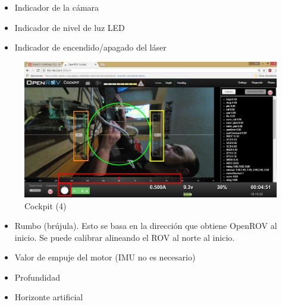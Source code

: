 \begin{itemize}
\item[\textcolor{red}{\textbullet}]Indicador de la cámara
\item[\textcolor{orange}{\textbullet}]Indicador de nivel de luz LED
\item[\textcolor{yellow}{\textbullet}]Indicador de encendido/apagado del láser
\end{itemize}

\newpage
\begin{figure} [hbtp]
\begin{center}
  \includegraphics[width=12cm]{img/cap3/3_5/cockpit4}
\end{center}
\caption{Cockpit (4)}
\label{fig:cockpit4}
\end{figure}
\begin{itemize}
\item[\textcolor{red}{\textbullet}]Rumbo (brújula). Esto se basa en la dirección que obtiene OpenROV al inicio. Se puede calibrar alineando el ROV al norte al inicio.
\item[\textcolor{orange}{\textbullet}]Valor de empuje del motor (IMU no es necesario)
\item[\textcolor{yellow}{\textbullet}]Profundidad
\item[\textcolor{green}{\textbullet}]Horizonte artificial
\end{itemize}

